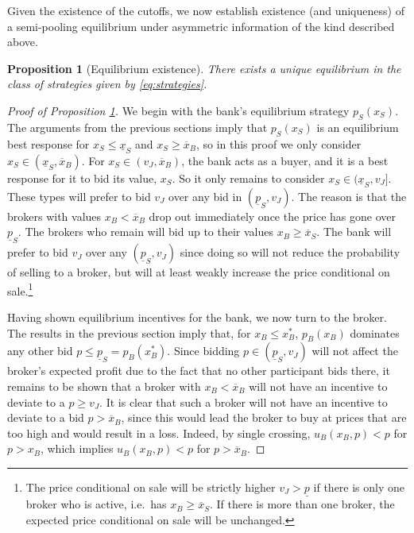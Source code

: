 \documentclass[11pt,twopage]{article}
\newcommand{\ol}{\overline}
\newcommand{\ul}{\underline}
\newtheorem{proposition}{Proposition}
{\bf}{\it}
\begin{document}
Given the existence of the cutoffs, we now establish existence (and uniqueness) of a semi-pooling equilibrium under asymmetric information of the kind described above.
\begin{proposition}[Equilibrium existence]\label{prop:equilibrium_existence}
There exists a unique equilibrium in the class of strategies given by \eqref{eq:strategies}.
\end{proposition}
\begin{proof}[Proof of Proposition \ref{prop:equilibrium_existence}] We begin with the bank's equilibrium strategy $p_S(x_S)$. The arguments from the previous sections imply that $p_S(x_S)$ is an equilibrium best response for $x_S \leq \underline x_S$ and $x_S \geq \overline x_B$, so in this proof we only consider $x_S \in (\underline x_S, \overline x_B)$. For $x_S \in (v_J, \ol x_B)$, the bank acts as a buyer, and it is a best response for it to bid its value, $x_S$. 
So it only remains to consider $x_S  \in (\underline x_S, v_J]$. These types will prefer to bid $v_J$ over any bid in $(\underline p_S, v_J)$. The reason is that the brokers with values $x_B<\overline x_B$ drop out immediately once the price has gone over $\underline p_S$. The brokers who remain will bid up to their values $x_B\geq \overline x_S$. The bank will prefer to bid $v_J$ over any $(\underline p_S, v_J)$ since doing so will not reduce the probability of selling to a broker, but will at least weakly increase the price conditional on sale.\footnote{The price conditional on sale will be strictly higher $v_J>\ul p$ if there is only one broker who is active, i.e.\ has $x_B\geq \overline x_S$. If there is more than one broker, the expected price conditional on sale will be unchanged.} 

Having shown equilibrium incentives for the bank, we now turn to the broker. The results in the previous section imply that, for  $x_B \leq x_B^*$, $p_B(x_B)$ dominates any other bid $p \leq \ul p_S = p_B(x_B^*)$. Since bidding $ p \in (\ul p_S,v_J) $ will not affect the broker's expected profit due to the fact that no other participant bids there, it remains to be shown that a broker with $x_B <  \ol x_B$ will not have an incentive to deviate to a $p\geq v_J$. It is clear that such a broker will not have an incentive to deviate to a bid $p> \ol x_B$, since this would lead the broker to buy at prices that are too high and would result in a loss. Indeed, by single crossing, $u_B(x_B,p) < p$ for $p>x_B$, which implies $u_B(x_B,p) < p$ for $p > \ol x_B$.


\end{proof}
\end{document}
